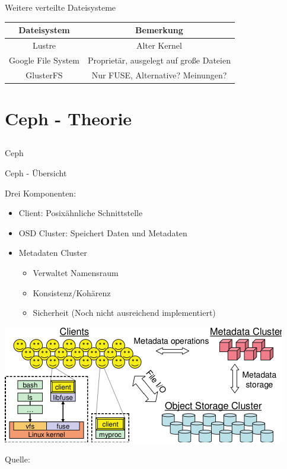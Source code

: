 \documentclass[notes=hide,yellow]{beamer}
\begin{document}
\begin{frame}{Weitere verteilte Dateisysteme}
	\begin{center}
		\begin{tabular}{|c|c|}
		\hline
		Dateisystem & Bemerkung \\
		\hline
		Lustre & Alter Kernel \\
		Google File System & Propriet\"ar, ausgelegt auf große Dateien \\
		GlusterFS & Nur FUSE, Alternative? Meinungen?\\
		\hline
	\end{tabular}
	\end{center}
\end{frame}


\section{Ceph - Theorie}
\subsection*{}

\begin{frame}
	\begin{center}
	\Large{Ceph}
	\end{center}
\end{frame}

\begin{frame}{Ceph - \"Ubersicht}
	
	Drei Komponenten:
	\begin{itemize}
		\item Client: Posix\"ahnliche Schnittstelle %
		\item OSD Cluster: Speichert Daten und Metadaten
		\item Metadaten Cluster
			\begin{itemize}
				\item Verwaltet Namensraum
				\item Konsistenz/Koh\"arenz
				\item Sicherheit (Noch nicht ausreichend implementiert)
			\end{itemize}
	\end{itemize}
\end{frame}

\begin{frame}
	\begin{center}
		\includegraphics{ceph_architecture.pdf}
	\end{center}
	Quelle: \cite{weil2006}
\end{frame}
\end{document}
